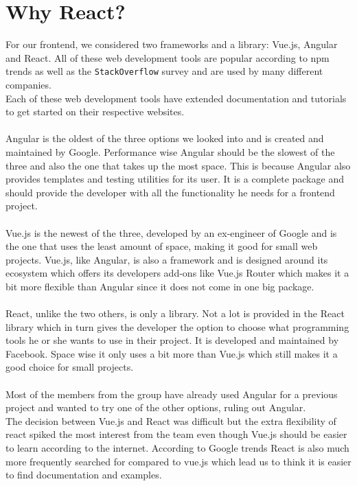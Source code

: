\section{Why React?}
For our frontend, we considered two frameworks and a library: Vue.js, Angular and React.
All of these web development tools are popular according to npm trends as well as the \texttt{StackOverflow} survey and are used by many different companies\cite{VueReactAngular}.
\\
Each of these web development tools have extended documentation and tutorials to get started on their respective websites.
\\\\
Angular is the oldest of the three options we looked into and is created and maintained by Google\cite{AngularHistory}.
Performance wise Angular should be the slowest of the three and also the one that takes up the most space\cite{VueReactAngular}.
This is because Angular also provides templates and testing utilities for its user.
It is a complete package and should provide the developer with all the functionality he needs for a frontend project.
\\\\
Vue.js is the newest of the three, developed by an ex-engineer of Google and is the one that uses the least amount of space, making it good for small web projects\cite{ComparisonWithOtherFrameworks}.
Vue.js, like Angular, is also a framework and is designed around its ecosystem which offers its developers add-ons like Vue.js Router which makes it a bit more flexible than Angular since it does not come in one big package.
\\\\
React, unlike the two others, is only a library\cite{ReactJS}.
Not a lot is provided in the React library which in turn gives the developer the option to choose what programming tools he or she wants to use in their project.
It is developed and maintained by Facebook\cite{ReactHistory}.
Space wise it only uses a bit more than Vue.js which still makes it a good choice for small projects.
\\\\
Most of the members from the group have already used Angular for a previous project and wanted to try one of the other options, ruling out Angular. 
\\
The decision between Vue.js and React was difficult but the extra flexibility of react spiked the most interest from the team even though Vue.js should be easier to learn according to the internet\cite{ComparisonWithOtherFrameworks}.
According to Google trends React is also much more frequently searched for compared to vue.js which lead us to think it is easier to find documentation and examples.

